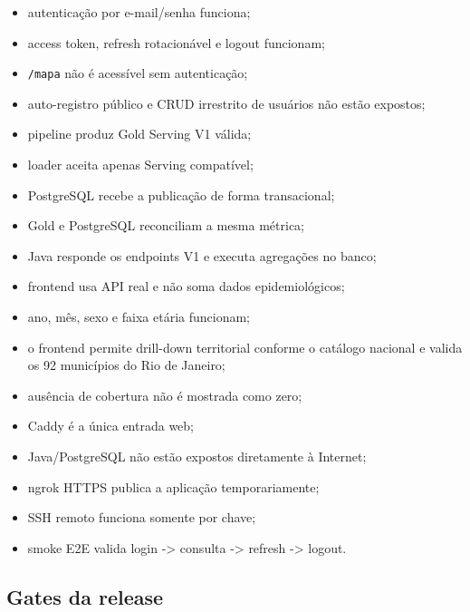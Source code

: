 \begin{itemize}
    \item autenticação por e-mail/senha funciona;
    \item access token, refresh rotacionável e logout funcionam;
    \item \texttt{/mapa} não é acessível sem autenticação;
    \item auto-registro público e CRUD irrestrito de usuários não estão expostos;
    \item pipeline produz Gold Serving V1 válida;
    \item loader aceita apenas Serving compatível;
    \item PostgreSQL recebe a publicação de forma transacional;
    \item Gold e PostgreSQL reconciliam a mesma métrica;
    \item Java responde os endpoints V1 e executa agregações no banco;
    \item frontend usa API real e não soma dados epidemiológicos;
    \item ano, mês, sexo e faixa etária funcionam;
    \item o frontend permite drill-down territorial conforme o catálogo nacional e valida os 92 municípios do Rio de Janeiro;
    \item ausência de cobertura não é mostrada como zero;
    \item Caddy é a única entrada web;
    \item Java/PostgreSQL não estão expostos diretamente à Internet;
    \item ngrok HTTPS publica a aplicação temporariamente;
    \item SSH remoto funciona somente por chave;
    \item smoke E2E valida login -> consulta -> refresh -> logout.
\end{itemize}

\subsection{Gates da release}

